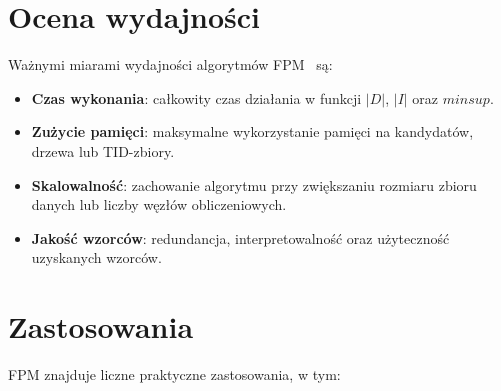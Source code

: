 \begin{algorithm}[!ht]
\LinesNumbered
{}
\caption{Recursive mining of weighted subgraphs in OWGraMi}
\label{alg:owgrami_recursive}
\end{algorithm}


\section{Ocena wydajności}
\label{sec:evaluation}
Ważnymi miarami wydajności algorytmów FPM~\cite{luna2019fimreview,kumar2019survey,kallay2025comparison} są:

\begin{itemize}
\item \textbf{Czas wykonania}: całkowity czas działania w funkcji $|D|$, $|I|$ oraz $minsup$.
\item \textbf{Zużycie pamięci}: maksymalne wykorzystanie pamięci na kandydatów, drzewa lub TID-zbiory.
\item \textbf{Skalowalność}: zachowanie algorytmu przy zwiększaniu rozmiaru zbioru danych lub liczby węzłów obliczeniowych.
\item \textbf{Jakość wzorców}: redundancja, interpretowalność oraz użyteczność uzyskanych wzorców.
\end{itemize}


\section{Zastosowania}
\label{sec:applications}
FPM znajduje liczne praktyczne zastosowania, w tym:

